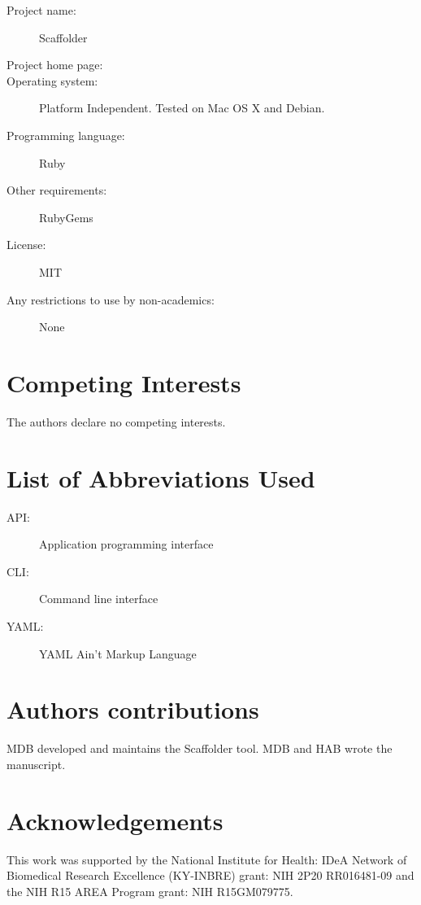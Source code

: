 \documentclass[10pt]{bmc_article}
\newenvironment{bmcformat}{\begin{raggedright}\baselineskip20pt\sloppy\setboolean{publ}{false}}{\end{raggedright}\baselineskip20pt\sloppy}
\begin{document}
\begin{bmcformat}
  \begin{description}
    \item[Project name:] Scaffolder
    \item[Project home page:] \scaffolder
    \item[Operating system:] Platform Independent. Tested on Mac OS X and
    Debian.
    \item[Programming language:] Ruby
    \item[Other requirements:] RubyGems
    \item[License:] MIT
    \item[Any restrictions to use by non-academics:] None
  \end{description}

\clearpage

\section*{Competing Interests} %

The authors declare no competing interests.

\section*{List of Abbreviations Used} %

  \begin{description}
    \item[API:] Application programming interface
    \item[CLI:] Command line interface
    \item[YAML:] YAML Ain't Markup Language\cite{yaml}
  \end{description}

\section*{Authors contributions} %

MDB developed and maintains the Scaffolder tool. MDB and HAB wrote the
manuscript.

\section*{Acknowledgements} %

This work was supported by the National Institute for Health: IDeA Network of
Biomedical Research Excellence (KY-INBRE) grant: NIH 2P20 RR016481-09 and the
NIH R15 AREA Program grant: NIH R15GM079775.


\end{bmcformat}
\end{document}
